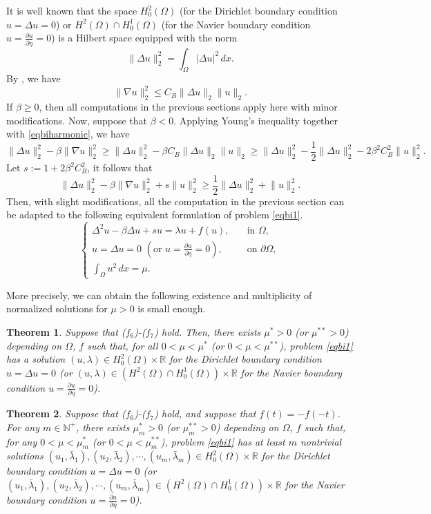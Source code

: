 \documentclass[11pt]{amsart}
\newtheorem{theorem}{Theorem}[section]
\newcommand{\abs}[1]{\lvert#1\rvert}
\newcommand{\norm}[1]{\lVert#1\rVert}
\newcommand{\R}{\mathbb{R}}
\numberwithin{equation}{section}
\begin{document}
It is well known that the space $H^2_0(\Omega)$ (for the Dirichlet boundary condition $u =\Delta u= 0$) or $H^2(\Omega) \cap H^1_0(\Omega)$ (for the Navier boundary condition $u=\frac{\partial u}{\partial \eta}=0$) is a Hilbert space equipped with the norm
$$
\norm{\Delta u}^2_2=\int_\Omega \abs{\Delta u}^2\,dx.
$$
By \cite{Ha2}, we have
\begin{equation}\label{eqbiharmonic}
    \norm{\nabla u}_2^2 \leq C_B\norm{\Delta u}_2\norm{u}_2.
\end{equation}
If $\beta \geq 0$, then all computations in the previous sections apply here with minor modifications.
Now, suppose that $\beta < 0$. Applying  Young's inequality together with \eqref{eqbiharmonic}, we have
$$
\norm{\Delta u}_2^2-\beta \norm{\nabla u}_2^2\geq  \norm{\Delta u}_2^2-\beta C_B\norm{\Delta u}_2\norm{u}_2\geq \norm{\Delta u}_2^2 - \frac{1}{2} \norm{\Delta u}_2^2 -2\beta^2 C_B^2\norm{u}^2_2.
$$
Let $s:= 1+ 2\beta^2 C_B^2$, it follows that
$$
\norm{\Delta u}_2^2-\beta \norm{\nabla u}_2^2 + s\norm{u}^2_2 \geq \frac{1}{2}\norm{\Delta u}_2^2+ \norm{u}^2_2.
$$
Then, with slight modifications, all the computation  in the previous section can be adapted to the following equivalent formulation of problem \eqref{eqbi1}.
\begin{equation} \label{eqbi2}
	\left\{
	\begin{array}{ll}
		\Delta^2 u-\beta \Delta u +su = \lambda u + f(u), \quad & \text{in } \Omega, \\
		u =\Delta u= 0 \,\, ( \mbox{or} \,\, u=\frac{\partial u}{\partial \eta}=0 ), & \text{on } \partial \Omega, \\
		\int_{\Omega} u^2\,dx = \mu.
	\end{array}
	\right.
\end{equation}

More precisely, we can obtain the following existence and multiplicity of normalized solutions for $\mu>0$ is small enough.
\begin{theorem}
Suppose that ($f_6$)-($f_7$) hold. Then, there exists $\mu^{*}>0$ (or $\mu^{**} > 0$)  depending on $\Omega$, $f$ such that, for all $0<\mu<\mu^{*}$ (or $0<\mu<\mu^{**}$), problem \eqref{eqbi1} has a solution $(u,\lambda) \in H^2_0(\Omega) \times  \R$ for the Dirichlet boundary condition $u =\Delta u= 0$ (or $(u,\lambda) \in (H^2(\Omega) \cap H^1_0(\Omega)) \times \R$ for the Navier boundary condition $u=\frac{\partial u}{\partial \eta}=0$).
\end{theorem}
\begin{theorem}
Suppose that ($f_6$)-($f_7$) hold, and suppose that $f(t)=-f(-t)$. For any $m \in \mathbb{N}^+$, there exists $\mu^{*}_{m} > 0$ (or $\mu^{**}_{m} > 0$) depending on $\Omega$, $f$ such that, for any $0 < \mu < \mu^{*}_{m}$ (or $0<\mu<\mu^{**}_m$), problem \eqref{eqbi1}  has at least $m$ nontrivial solutions $(u_1,\bar{\lambda}_1), (u_2,\bar{\lambda}_2),\cdots,(u_m,\bar{\lambda}_m) \in H_0^{2}(\Omega)\times  \R$ for the Dirichlet boundary condition $u =\Delta u= 0$ (or $(u_1,\bar{\lambda}_1), (u_2,\bar{\lambda}_2),\cdots,(u_m,\bar{\lambda}_m)\in (H^2(\Omega) \cap H^1_0(\Omega)) \times \R$ for the Navier boundary condition $u=\frac{\partial u}{\partial \eta}=0$).
\end{theorem}
\end{document}
